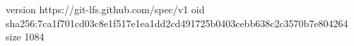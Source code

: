 version https://git-lfs.github.com/spec/v1
oid sha256:7ca1f701cd03c8e1f517e1ea1dd2cd491725b0403cebb638c2c3570b7e804264
size 1084
